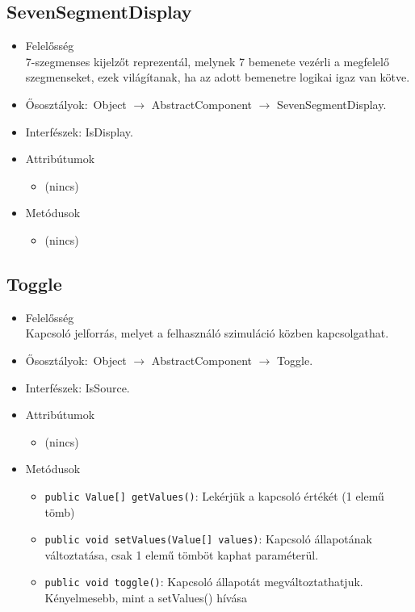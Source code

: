 \subsection{SevenSegmentDisplay}
\begin{itemize}
\item Felelősség\\
7-szegmenses kijelzőt reprezentál, melynek 7 bemenete vezérli a  megfelelő szegmenseket, ezek világítanak, ha az adott bemenetre logikai  igaz van kötve.
\item Ősosztályok:\ Object $\rightarrow{}$ AbstractComponent $\rightarrow{}$ SevenSegmentDisplay.
\item Interfészek: IsDisplay.
\item Attribútumok $\ $
\begin{itemize}
\item (nincs)
\end{itemize}
\item Metódusok$\ $
\begin{itemize}
\item (nincs)
\end{itemize}
\end{itemize}

\subsection{Toggle}
\begin{itemize}
\item Felelősség\\
Kapcsoló jelforrás, melyet a felhasználó szimuláció közben kapcsolgathat.
\item Ősosztályok:\ Object $\rightarrow{}$ AbstractComponent $\rightarrow{}$ Toggle.
\item Interfészek: IsSource.
\item Attribútumok $\ $
\begin{itemize}
\item (nincs)
\end{itemize}
\item Metódusok$\ $
\begin{itemize}
	\item \texttt{public Value[] getValues()}: Lekérjük a kapcsoló értékét (1 elemű tömb)
	\item \texttt{public void setValues(Value[] values)}: Kapcsoló állapotának változtatása, csak 1 elemű tömböt kaphat paraméterül.
	\item \texttt{public void toggle()}: Kapcsoló állapotát megváltoztathatjuk. Kényelmesebb, mint a setValues() hívása
\end{itemize}
\end{itemize}

